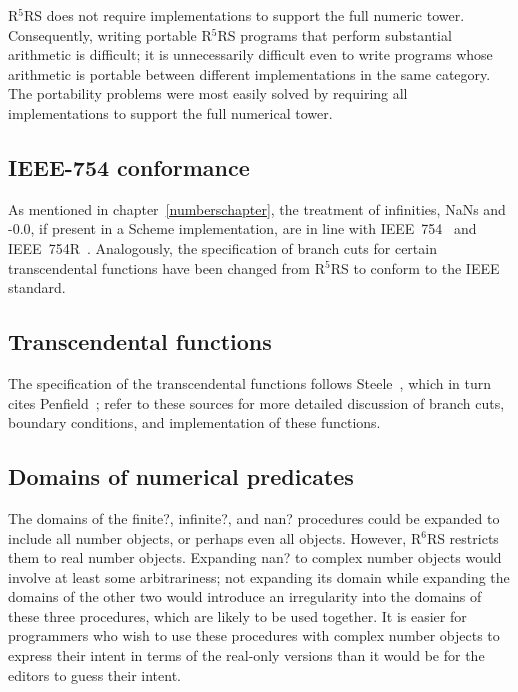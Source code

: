 \documentclass[twoside,twocolumn]{algol60}
\newcommand{\rn}[1]{R$^{#1}$RS}
\begin{document}
\rn{5} does not require implementations to support the full numeric
tower.  Consequently, writing portable \rn{5} programs that
perform substantial arithmetic is difficult; it is unnecessarily difficult even
to write programs whose arithmetic is portable between different
implementations in the same category.  The portability problems were
most easily solved by requiring all implementations to support the
full numerical tower.

\subsection{IEEE-754 conformance}

As mentioned in chapter~\ref{numberschapter}, the treatment of
infinities, NaNs and -0.0, if present in a Scheme implementation, are
in line with IEEE~754~\cite{IEEE} and IEEE~754R~\cite{IEEE754R}.
Analogously, the specification of branch cuts for certain
transcendental functions have been changed from \rn{5} to conform to
the IEEE standard.

\subsection{Transcendental functions}

The specification of the transcendental functions follows
Steele~\cite{CLtL}, which in turn cites Penfield~\cite{Penfield81};
refer to these sources for more detailed discussion of branch cuts,
boundary conditions, and implementation of these functions.

\subsection{Domains of numerical predicates}

The domains of the {\cf finite?}, {\cf infinite?}, and {\cf nan?}
procedures could be expanded to include all number objects, or perhaps even
all objects.  However, \rn{6} restricts them to real number objects.
Expanding {\cf nan?} to complex number objects would involve at least some
arbitrariness; not expanding its domain while expanding the domains of
the other two would introduce an irregularity into the domains of
these three procedures, which are likely to be used together.  It is
easier for programmers who wish to use these procedures with complex
number objects to express their intent in terms of the real-only versions
than it would be for the editors to guess their intent.
\end{document}
